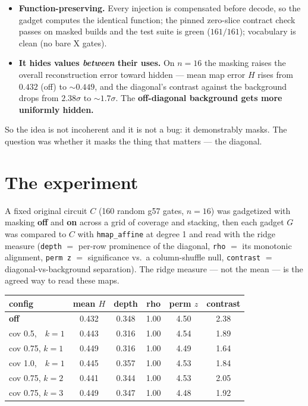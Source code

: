\documentclass[11pt]{article}
\newcommand{\code}[1]{\texttt{#1}}
\begin{document}
\begin{itemize}
\item \textbf{Function-preserving.} Every injection is compensated before
decode, so the gadget computes the identical function; the pinned zero-slice
contract check passes on masked builds and the test suite is green
($161/161$); vocabulary is clean (no bare X gates).
\item \textbf{It hides values \emph{between} their uses.} On $n{=}16$ the
masking raises the overall reconstruction error toward hidden --- mean map
error $H$ rises from $0.432$ (off) to ${\sim}0.449$, and the diagonal's
contrast against the background drops from $2.38\sigma$ to ${\sim}1.7\sigma$.
The \textbf{off-diagonal background gets more uniformly hidden.}
\end{itemize}

So the idea is not incoherent and it is not a bug: it demonstrably masks. The
question was whether it masks the thing that matters --- the diagonal.

\section{The experiment}

A fixed original circuit $C$ (160 random g57 gates, $n{=}16$) was gadgetized
with masking \textbf{off} and \textbf{on} across a grid of coverage and
stacking, then each gadget $G$ was compared to $C$ with \code{hmap\_affine}
at degree 1 and read with the ridge measure (\code{depth} $=$ per-row
prominence of the diagonal, \code{rho} $=$ its monotonic alignment,
\code{perm z} $=$ significance vs.\ a column-shuffle null, \code{contrast} $=$
diagonal-vs-background separation). The ridge measure --- not the mean --- is
the agreed way to read these maps.

\begin{center}
\begin{tabular}{lccccc}
\toprule
config & mean $H$ & depth & rho & perm $z$ & contrast \\
\midrule
\textbf{off}       & 0.432 & 0.348 & 1.00 & 4.50 & 2.38 \\
cov 0.5,\ \ $k{=}1$ & 0.443 & 0.316 & 1.00 & 4.54 & 1.89 \\
cov 0.75, $k{=}1$  & 0.449 & 0.316 & 1.00 & 4.49 & 1.64 \\
cov 1.0,\ \ $k{=}1$ & 0.445 & 0.357 & 1.00 & 4.53 & 1.84 \\
cov 0.75, $k{=}2$  & 0.441 & 0.344 & 1.00 & 4.53 & 2.05 \\
cov 0.75, $k{=}3$  & 0.449 & 0.347 & 1.00 & 4.48 & 1.92 \\
\bottomrule
\end{tabular}
\end{center}
\end{document}
